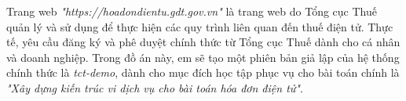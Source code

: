 Trang web \emph{"https://hoadondientu.gdt.gov.vn"} là trang web do Tổng cục Thuế   quản lý và sử dụng để thực hiện các quy trình liên quan đến thuế điện tử. Thực tế, yêu cầu đăng ký và phê duyệt chính thức từ  Tổng cục Thuế dành cho cá nhân và doanh nghiệp. Trong đồ án này, em sẽ tạo một phiên bản giả lập của hệ thống chính thức là \emph{tct-demo}, dành cho mục đích học tập phục vụ cho bài toán chính là \emph{"Xây dựng kiến trúc vi dịch vụ cho bài toán hóa đơn điện tử"}.